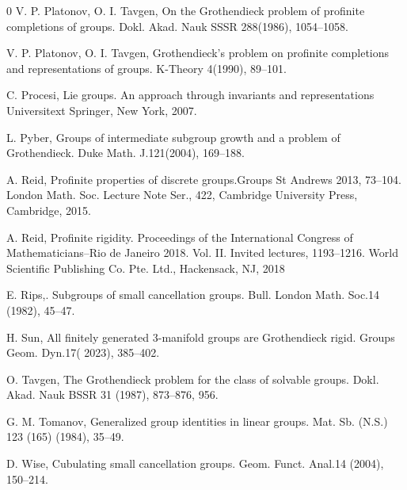 \documentclass{amsart}
\theoremstyle{definition}
\theoremstyle{remark}
\begin{document}
\begin{thebibliography}{0}
 V. P. Platonov,  O. I.  Tavgen\textquotesingle, On the Grothendieck problem of profinite completions of groups. Dokl. Akad. Nauk SSSR 288(1986), 1054--1058.
 
 V. P. Platonov,  O. I.  Tavgen\textquotesingle, Grothendieck's problem on profinite completions and representations of groups. K-Theory  4(1990),  89--101.

 
  C. Procesi,  Lie groups.
An approach through invariants and representations
Universitext
Springer, New York, 2007.  
 
  L. Pyber,  Groups of intermediate subgroup growth and a problem of Grothendieck.
Duke Math. J.121(2004),   169--188.

 A. Reid,  
Profinite properties of discrete groups.Groups St Andrews 2013, 73--104.
London Math. Soc. Lecture Note Ser., 422,
Cambridge University Press, Cambridge, 2015.


 A.  Reid,  Profinite rigidity. Proceedings of the International Congress of Mathematicians--Rio de Janeiro 2018. Vol. II. Invited lectures, 1193--1216.
World Scientific Publishing Co. Pte. Ltd., Hackensack, NJ, 2018

 E. Rips,.
Subgroups of small cancellation groups.
Bull. London Math. Soc.14 (1982),   45--47.


 H. Sun,  
All finitely generated 3-manifold groups are Grothendieck rigid. Groups Geom. Dyn.17( 2023),  385--402.

 O.   Tavgen\textquotesingle,
The Grothendieck problem for the class of solvable groups. Dokl. Akad. Nauk BSSR 31 (1987),   873--876, 956.

 G. M.  Tomanov,  Generalized group identities in linear groups. 
Mat. Sb. (N.S.) 123  (165) (1984),   35--49.

 D. Wise, 
Cubulating small cancellation groups. Geom. Funct. Anal.14 (2004),   150--214.


\end{thebibliography}

 
\end{document}
